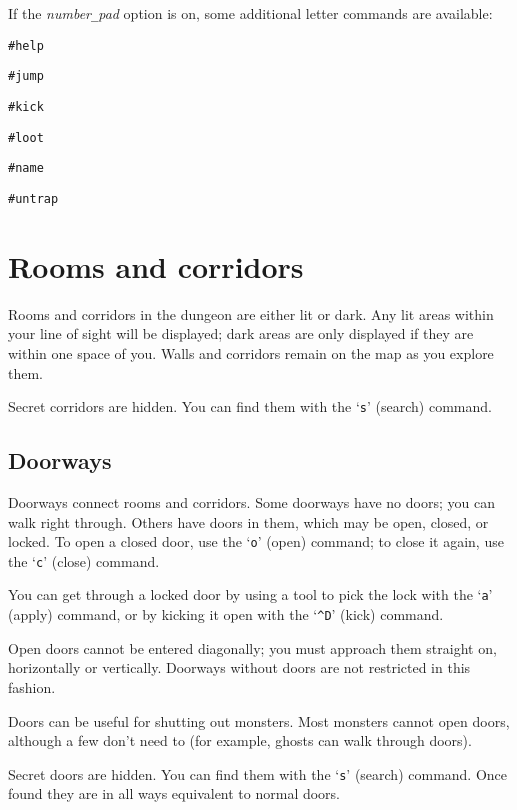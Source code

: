 \nd If the {\it number\verb+_+pad\/} option is on, some additional letter commands
are available:
\blist{}
\item[\tb{h}]
{\tt\#help}
\item[\tb{j}]
{\tt\#jump}
\item[\tb{k}]
{\tt\#kick}
\item[\tb{l}]
{\tt\#loot}
\item[\tb{N}]
{\tt\#name}
\item[\tb{u}]
{\tt\#untrap}
\elist

\section{Rooms and corridors}

Rooms and corridors in the dungeon are either lit or dark.
Any lit areas within your line of sight will be displayed;
dark areas are only displayed if they are within one space of you.
Walls and corridors remain on the map as you explore them.

Secret corridors are hidden.  You can find them with the `{\tt s}' (search)
command.

\subsection*{Doorways}

Doorways connect rooms and corridors.  Some doorways have no doors;
you can walk right through.  Others have doors in them, which may be
open, closed, or locked.  To open a closed door, use the `{\tt o}' (open)
command; to close it again, use the `{\tt c}' (close) command.

You can get through a locked door by using a tool to pick the lock
with the `{\tt a}' (apply) command, or by kicking it open with the
`{\tt \^{}D}' (kick) command.

Open doors cannot be entered diagonally; you must approach them
straight on, horizontally or vertically.  Doorways without doors are
not restricted in this fashion.

Doors can be useful for shutting out monsters.  Most monsters cannot
open doors, although a few don't need to (for example, ghosts can walk through
doors).

Secret doors are hidden.  You can find them with the `{\tt s}' (search)
command.  Once found they are in all ways equivalent to normal doors.

